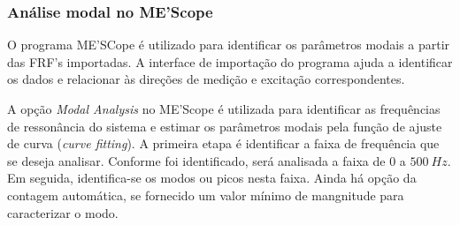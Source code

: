 








\subsubsection{Análise modal no ME'Scope}

O programa ME'SCope é utilizado para identificar os parâmetros modais a partir
das FRF's importadas. A interface de importação do programa ajuda a identificar
os dados e relacionar às direções de medição e excitação correspondentes.

A opção \textit{Modal Analysis} no ME'Scope é utilizada para identificar as
frequências de ressonância do sistema e estimar os parâmetros modais pela função
de ajuste de curva (\textit{curve fitting}). A primeira etapa é identificar a
faixa de frequência que se deseja analisar. Conforme foi identificado, será
analisada a faixa de $0$ a $500~Hz$. Em seguida, identifica-se os modos ou picos
nesta faixa. Ainda há opção da contagem automática, se fornecido um valor
mínimo de mangnitude para caracterizar o modo.



